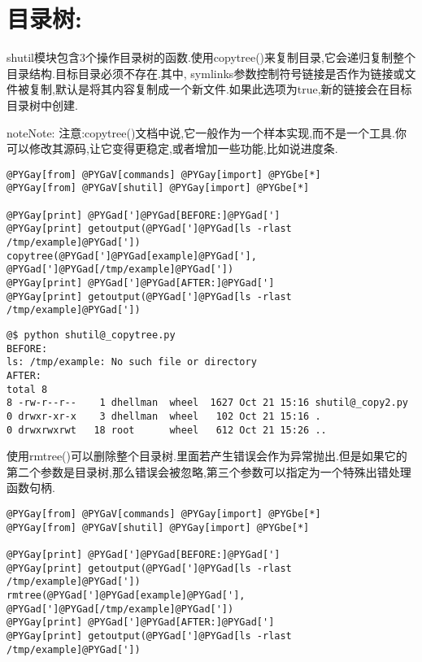 \documentclass[a4paper,10pt,english]{manual}
\begin{document}
\section{目录树:}

shutil模块包含3个操作目录树的函数.使用copytree()来复制目录,它会递归复制整个目录结构.目标目录必须不存在.其中, symlinks参数控制符号链接是否作为链接或文件被复制,默认是将其内容复制成一个新文件.如果此选项为true,新的链接会在目标目录树中创建.

\begin{notice}{note}{Note:}
注意:copytree()文档中说,它一般作为一个样本实现,而不是一个工具.你可以修改其源码,让它变得更稳定,或者增加一些功能,比如说进度条.
\end{notice}

\begin{Verbatim}[commandchars=@\[\]]
@PYGay[from] @PYGaV[commands] @PYGay[import] @PYGbe[*]
@PYGay[from] @PYGaV[shutil] @PYGay[import] @PYGbe[*]

@PYGay[print] @PYGad[']@PYGad[BEFORE:]@PYGad[']
@PYGay[print] getoutput(@PYGad[']@PYGad[ls -rlast /tmp/example]@PYGad['])
copytree(@PYGad[']@PYGad[example]@PYGad['], @PYGad[']@PYGad[/tmp/example]@PYGad['])
@PYGay[print] @PYGad[']@PYGad[AFTER:]@PYGad[']
@PYGay[print] getoutput(@PYGad[']@PYGad[ls -rlast /tmp/example]@PYGad['])
\end{Verbatim}

\begin{Verbatim}[commandchars=@\[\]]
@$ python shutil@_copytree.py
BEFORE:
ls: /tmp/example: No such file or directory
AFTER:
total 8
8 -rw-r--r--    1 dhellman  wheel  1627 Oct 21 15:16 shutil@_copy2.py
0 drwxr-xr-x    3 dhellman  wheel   102 Oct 21 15:16 .
0 drwxrwxrwt   18 root      wheel   612 Oct 21 15:26 ..
\end{Verbatim}

使用rmtree()可以删除整个目录树.里面若产生错误会作为异常抛出.但是如果它的第二个参数是目录树,那么错误会被忽略,第三个参数可以指定为一个特殊出错处理函数句柄.

\begin{Verbatim}[commandchars=@\[\]]
@PYGay[from] @PYGaV[commands] @PYGay[import] @PYGbe[*]
@PYGay[from] @PYGaV[shutil] @PYGay[import] @PYGbe[*]

@PYGay[print] @PYGad[']@PYGad[BEFORE:]@PYGad[']
@PYGay[print] getoutput(@PYGad[']@PYGad[ls -rlast /tmp/example]@PYGad['])
rmtree(@PYGad[']@PYGad[example]@PYGad['], @PYGad[']@PYGad[/tmp/example]@PYGad['])
@PYGay[print] @PYGad[']@PYGad[AFTER:]@PYGad[']
@PYGay[print] getoutput(@PYGad[']@PYGad[ls -rlast /tmp/example]@PYGad['])
\end{Verbatim}
\end{document}
